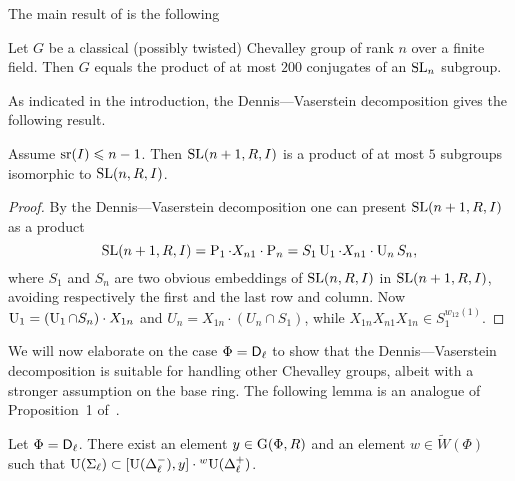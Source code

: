 The main result of \cite{NikProdDecomp} is the following
\begin{thm*}
Let $G$ be a classical (possibly twisted) Chevalley group of rank $n$ over a finite field. Then $G$ equals the product of at most $200$ conjugates of an $\operatorname{SL}_n$ subgroup.
\end{thm*}
As indicated in the introduction, the Dennis---Vaserstein decomposition gives the following result.
\begin{lemma}
Assume $\operatorname{sr}(I)\leqslant n-1$. Then $\operatorname{SL}(n+1,R,I)$ is a product of at most $5$ subgroups isomorphic to $\operatorname{SL}(n,R,I)$.
\end{lemma}
\begin{proof}
By the Dennis---Vaserstein decomposition one can present $\operatorname{SL}(n+1,R,I)$ as a product
\[ \operatorname{SL}(n+1,R,I) =  \operatorname{P}_1\cdot X_{n1}\cdot\operatorname{P}_n=S_1\operatorname{U}_1\cdot X_{n1}\cdot\operatorname{U}_n S_n, \]
where $S_1$ and $S_n$ are two obvious embeddings of $\operatorname{SL}(n,R,I)$ in $\operatorname{SL}(n+1,R,I)$, avoiding respectively the first and the last row and column. Now $\operatorname{U}_1=(\operatorname{U}_1\cap S_n)\cdot X_{1n}$ and $U_n= X_{1n}\cdot(U_n\cap S_1)$, while $X_{1n}X_{n1}X_{1n}\in S_1^{w_{12}(1)}$.
\end{proof}
We will now elaborate on the case $\Phi=\mathsf{D}_\ell$ to show that the Dennis---Vaserstein decomposition is suitable for handling other Chevalley groups, albeit with a stronger assumption on the base ring. The following lemma is an analogue of Proposition~1 of~\cite{NikProdDecomp}.
\begin{lemma}\label{lemma:nikolov-type-dl}
Let $\Phi=\mathsf{D}_\ell$. There exist an element $y\in\operatorname{G}(\Phi,R)$ and an element $w\in\widetilde{W}(\Phi)$ such that $\operatorname{U}(\Sigma_\ell)\subset[\operatorname{U}(\Delta_\ell^-),y]\cdot{}^w\!\operatorname{U}(\Delta_\ell^+)$.
\end{lemma}
